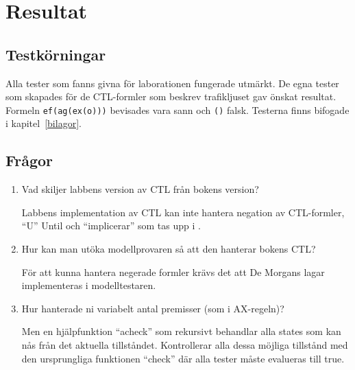\section{Resultat}

\subsection{Testkörningar}
\label{sub:test}

Alla tester som fanns givna för laborationen fungerade utmärkt. De egna tester som skapades för de CTL-formler som beskrev trafikljuset gav önskat resultat. Formeln \texttt{ef(ag(ex(o)))} bevisades vara sann och \texttt{()} falsk. Testerna finns bifogade i kapitel~\ref{bilagor}.


\subsection{Frågor}
\label{sub:fragor}

\renewcommand{\labelenumi}{(\alph{enumi})}
\begin{enumerate}
\item Vad skiljer labbens version av CTL från bokens version?

Labbens implementation av CTL kan inte hantera negation av CTL-formler, “U” Until och
“implicerar” som tas upp i \cite{huth}.

\item Hur kan man utöka modellprovaren så att den hanterar bokens CTL?

För att kunna hantera negerade formler krävs det att De Morgans lagar implementeras i
modelltestaren. 

\item Hur hanterade ni variabelt antal premisser (som i AX-regeln)?

Men en hjälpfunktion “acheck” som rekursivt behandlar alla states som kan nås från det aktuella tillståndet. Kontrollerar alla dessa möjliga tillstånd med den ursprungliga funktionen “check” där alla tester måste evalueras till true.

\end{enumerate}
